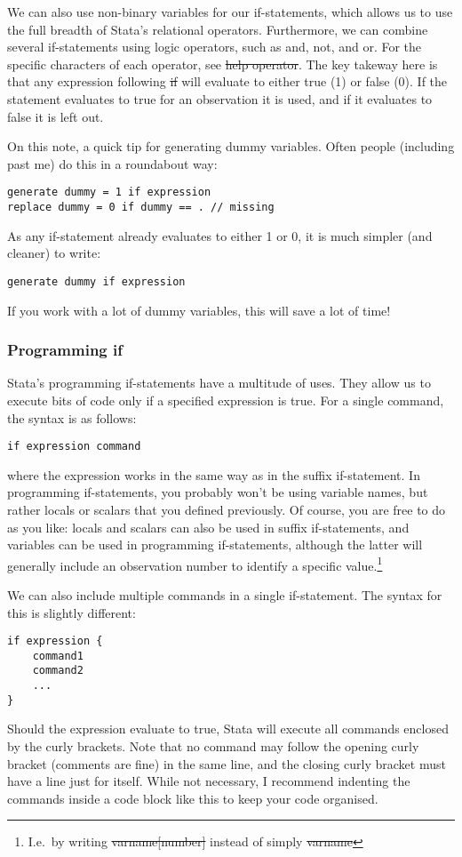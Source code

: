 We can also use non-binary variables for our if-statements,
which allows us to use the full breadth of Stata's relational operators.
Furthermore, we can combine several if-statements using logic operators,
such as and, not, and or.
For the specific characters of each operator, see \st{help operator}.
The key takeway here is that any expression following \st{if} will evaluate to either true (1) or false (0).
If the statement evaluates to true for an observation it is used,
and if it evaluates to false it is left out.

On this note,
a quick tip for generating dummy variables.
Often people (including past me) do this in a roundabout way:
\begin{verbatim}
generate dummy = 1 if expression
replace dummy = 0 if dummy == . // missing
\end{verbatim}
As any if-statement already evaluates to either 1 or 0,
it is much simpler (and cleaner) to write:
\begin{verbatim}
generate dummy if expression
\end{verbatim}
If you work with a lot of dummy variables, this will save a lot of time!

\subsubsection{Programming if}
Stata's programming if-statements have a multitude of uses.
They allow us to execute bits of code only if a specified expression is true.
For a single command,
the syntax is as follows:
\begin{verbatim}
if expression command
\end{verbatim}
where the expression works in the same way as in the suffix if-statement.
In programming if-statements,
you probably won't be using variable names,
but rather locals or scalars that you defined previously.
Of course,
you are free to do as you like:
locals and scalars can also be used in suffix if-statements,
and variables can be used in programming if-statements,
although the latter will generally include an observation number to identify a specific value.\footnote{I.e.\ by writing \st{varname[number]} instead of simply \st{varname}}

We can also include multiple commands in a single if-statement.
The syntax for this is slightly different:
\begin{verbatim}
if expression {
    command1
    command2
    ...
}
\end{verbatim}
Should the expression evaluate to true,
Stata will execute all commands enclosed by the curly brackets.
Note that no command may follow the opening curly bracket (comments are fine) in the same line,
and the closing curly bracket must have a line just for itself.
While not necessary,
I recommend indenting the commands inside a code block like this to keep your code organised.


